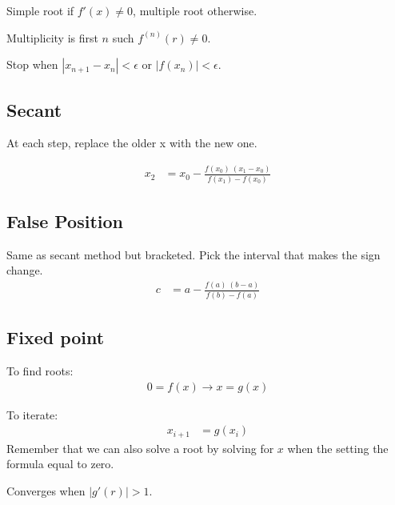 \documentclass[12pt]{article}
\newcommand{\straight}[1]{\left|       #1 \right|}
\begin{document}
Simple root if $f'(x) \neq 0$, multiple root otherwise.

Multiplicity is first $n$ such $f^{(n)}(r) \neq 0$.

Stop when $\straight{x_{n+1} - x_n} < \epsilon$ or $\straight{f(x_n)} < \epsilon$.

\subsection*{Secant}
At each step, replace the older x with the new one.

\begin{align*}
    x_2 &= x_0 - \frac{f(x_0)\ (x_1 - x_0)}{f(x_1) - f(x_0)}
\end{align*}

\subsection*{False Position}
Same as secant method but bracketed. Pick the interval that makes the sign change.
\begin{align*}
    c &= a - \frac{f(a)\ (b - a)}{f(b) - f(a)}
\end{align*}

\subsection*{Fixed point}
To find roots:
\begin{align*}
    0 = f(x) \rightarrow x = g(x)
\end{align*}

To iterate:
\begin{align*}
    x_{i+1} &= g(x_i)
\end{align*}
Remember that we can also solve a root by solving for $x$ when the setting the formula equal to zero.

Converges when $\straight{g'(r)} > 1$.
\end{document}
